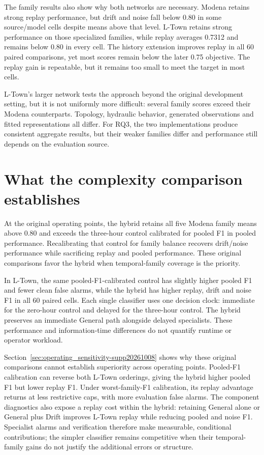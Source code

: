 The family results also show why both networks are necessary. Modena retains strong replay performance, but drift and noise fall below 0.80 in some source/model cells despite means above that level. L-Town retains strong performance on those specialized families, while replay averages 0.7312 and remains below 0.80 in every cell. The history extension improves replay in all 60 paired comparisons, yet most scores remain below the later 0.75 objective. The replay gain is repeatable, but it remains too small to meet the target in most cells.

L-Town's larger network tests the approach beyond the original development setting, but it is not uniformly more difficult: several family scores exceed their Modena counterparts. Topology, hydraulic behavior, generated observations and fitted representations all differ. For RQ3, the two implementations produce consistent aggregate results, but their weaker families differ and performance still depends on the evaluation source.

\section{What the complexity comparison establishes}
At the original operating points, the hybrid retains all five Modena family means above 0.80 and exceeds the three-hour control calibrated for pooled F1 in pooled performance. Recalibrating that control for family balance recovers drift/noise performance while sacrificing replay and pooled performance. These original comparisons favor the hybrid when temporal-family coverage is the priority.

In L-Town, the same pooled-F1-calibrated control has slightly higher pooled F1 and fewer clean false alarms, while the hybrid has higher replay, drift and noise F1 in all 60 paired cells. Each single classifier uses one decision clock: immediate for the zero-hour control and delayed for the three-hour control. The hybrid preserves an immediate General path alongside delayed specialists. These performance and information-time differences do not quantify runtime or operator workload.

Section~\ref{sec:operating_sensitivity-supp20261008} shows why these original comparisons cannot establish superiority across operating points. Pooled-F1 calibration can reverse both L-Town orderings, giving the hybrid higher pooled F1 but lower replay F1. Under worst-family-F1 calibration, its replay advantage returns at less restrictive caps, with more evaluation false alarms. The component diagnostics also expose a replay cost within the hybrid: retaining General alone or General plus Drift improves L-Town replay while reducing pooled and noise F1. Specialist alarms and verification therefore make measurable, conditional contributions; the simpler classifier remains competitive when their temporal-family gains do not justify the additional errors or structure.

